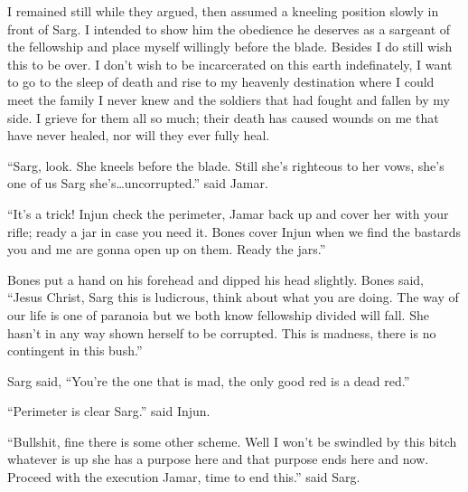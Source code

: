 I remained still while they argued, then assumed a kneeling position slowly in front of Sarg. I intended to show him the obedience he deserves as a sargeant of the fellowship and place myself willingly before the blade. Besides I do still wish this to be over. I don't wish to be incarcerated on this earth indefinately, I want to go to the sleep of death and rise to my heavenly destination where I could meet the family I never knew and the soldiers that had fought and fallen by my side. I grieve for them all so much; their death has caused wounds on me that have never healed, nor will they ever fully heal.

``Sarg, look. She kneels before the blade. Still she's righteous to her vows, she's one of us Sarg she's\dots uncorrupted.'' said Jamar. 

``It's a trick! Injun check the perimeter, Jamar back up and cover her with your rifle; ready a jar in case you need it. Bones cover Injun when we find the bastards you and me are gonna open up on them. Ready the jars.'' 

Bones put a hand on his forehead and dipped his head slightly. Bones said, ``Jesus Christ, Sarg this is ludicrous, think about what you are doing. The way of our life is one of paranoia but we both know fellowship divided will fall. She hasn't in any way shown herself to be corrupted. This is madness, there is no contingent in this bush.'' 

Sarg said, ``You're the one that is mad, the only good red is a dead red.''

``Perimeter is clear Sarg.'' said Injun. 

``Bullshit, fine there is some other scheme. Well I won't be swindled by this bitch whatever is up she has a purpose here and that purpose ends here and now. Proceed with the execution Jamar, time to end this.'' said Sarg.










